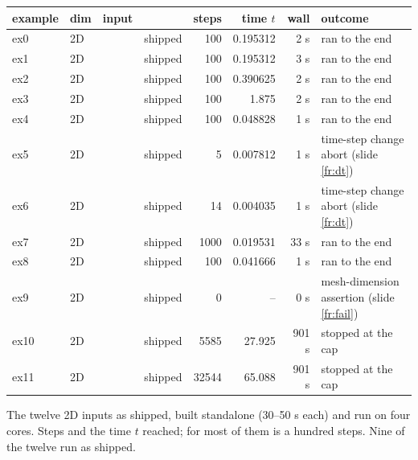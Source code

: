 \setlength{\tabcolsep}{3pt}
\begin{tabular}{@{}l l l l r r r L{0.3\textwidth}@{}}
\toprule
example & dim & input &  & steps & time $t$ & wall & outcome \\
\midrule
ex0 & 2D &  & shipped & 100 & 0.195312 & 2 s & ran to the end \\
ex1 & 2D &  & shipped & 100 & 0.195312 & 3 s & ran to the end \\
ex2 & 2D &  & shipped & 100 & 0.390625 & 2 s & ran to the end \\
ex3 & 2D &  & shipped & 100 & 1.875 & 2 s & ran to the end \\
ex4 & 2D &  & shipped & 100 & 0.048828 & 1 s & ran to the end \\
ex5 & 2D &  & shipped & 5 & 0.007812 & 1 s & time-step change abort (slide \ref{fr:dt}) \\
ex6 & 2D &  & shipped & 14 & 0.004035 & 1 s & time-step change abort (slide \ref{fr:dt}) \\
ex7 & 2D &  & shipped & 1000 & 0.019531 & 33 s & ran to the end \\
ex8 & 2D &  & shipped & 100 & 0.041666 & 1 s & ran to the end \\
ex9 & 2D &  & shipped & 0 & -- & 0 s & mesh-dimension assertion (slide \ref{fr:fail}) \\
ex10 & 2D &  & shipped & 5585 & 27.925 & 901 s & stopped at the cap \\
ex11 & 2D &  & shipped & 32544 & 65.088 & 901 s & stopped at the cap \\
\bottomrule
\end{tabular}

\medskip
\scriptsize The twelve 2D inputs as shipped, built standalone (30--50 s each) and run on four cores. Steps and the time $t$ reached;  for most of them is a hundred steps. Nine of the twelve run as shipped.

